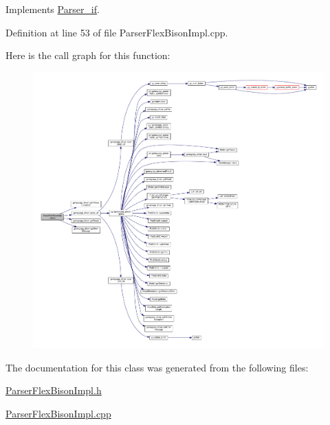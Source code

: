 Implements \hyperlink{class_parser__if_af163b0c5b081ccfa2ba04267cd4741b1}{Parser\-\_\-if}.



Definition at line 53 of file Parser\-Flex\-Bison\-Impl.\-cpp.



Here is the call graph for this function\-:
\nopagebreak
\begin{figure}[H]
\begin{center}
\leavevmode
\includegraphics[width=350pt]{class_parser_flex_bison_impl_a25fd55be19467472557819b6eba9f833_cgraph}
\end{center}
\end{figure}




The documentation for this class was generated from the following files\-:\begin{DoxyCompactItemize}
\item 
\hyperlink{_parser_flex_bison_impl_8h}{Parser\-Flex\-Bison\-Impl.\-h}\item 
\hyperlink{_parser_flex_bison_impl_8cpp}{Parser\-Flex\-Bison\-Impl.\-cpp}\end{DoxyCompactItemize}
